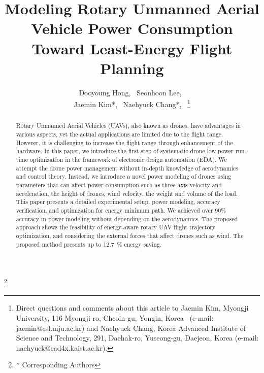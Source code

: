 \documentclass[journal]{./template/IEEEtran}
\begin{document}
\makeatletter

\newcommand\blfootnote[1]{%
  \begingroup
  \renewcommand\thefootnote{}\footnote{#1}%
  \addtocounter{footnote}{-1}%
  \endgroup
}

\newcommand\fs@norules{\def\@fs@cfont{\bfseries}\let\@fs@capt\floatc@ruled
  \def\@fs@pre{}%
  \def\@fs@post{}%
  \def\@fs@mid{\kern3pt}%
  \let\@fs@iftopcapt\iftrue}
\makeatother
{}

\title{Modeling Rotary Unmanned Aerial Vehicle Power Consumption Toward Least-Energy Flight Planning\\
}
\author{
Dooyoung Hong,~
Seonhoon Lee,~\\
Jaemin Kim*,~
Naehyuck Chang*,~
\thanks{Direct questions and comments about this article to Jaemin Kim, Myongji University, 116 Myongji-ro, Cheoin-gu, Yongin, Korea~ (e-mail: jaemin@esl.mju.ac.kr) and Naehyuck Chang, Korea Advanced Institute of Science and Technology, 291, Daehak-ro, Yuseong-gu, Daejeon, Korea (e-mail: naehyuck@cad4x.kaist.ac.kr).}
}
\maketitle
\blfootnote{* Corresponding Authors}

\begin{abstract}
Rotary Unmanned Aerial Vehicles (UAVs), also known as drones, have advantages in various aspects, yet the actual applications are limited due to the flight range. However, it is challenging to increase the flight range through enhancement of the hardware. 
In this paper, we introduce the first step of systematic drone low-power run-time optimization in the framework of electronic design automation (EDA). 
We attempt the drone power management without in-depth knowledge of aerodynamics and control theory. 
Instead, we introduce a novel power modeling of drones using parameters that can affect power consumption such as three-axis velocity and acceleration, the height of drones, wind velocity, the weight and volume of the load. 
This paper presents a detailed experimental setup, power modeling, accuracy verification, and optimization for energy minimum path. 
We achieved over 90\% accuracy in power modeling without depending on the aerodynamics. 
The proposed approach shows the feasibility of energy-aware rotary UAV flight trajectory optimization, and considering the external forces that affect drones such as wind. The proposed method presents up to 12.7~\% energy saving.
\label{Section: abstract}
\end{abstract}
\end{document}
